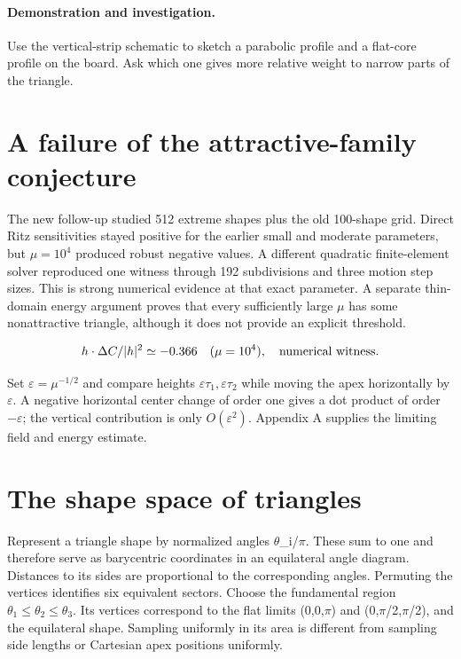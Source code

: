 \documentclass[11pt,oneside,openany]{book}
\begin{document}
\paragraph{Demonstration and investigation.} Use the vertical-strip schematic to sketch a parabolic profile and a flat-core profile on the board. Ask which one gives more relative weight to narrow parts of the triangle.


\section{A failure of the attractive-family conjecture}\label{sec:slide70}

The new follow-up studied 512 extreme shapes plus the old 100-shape grid. Direct Ritz sensitivities stayed positive for the earlier small and moderate parameters, but $\mu=10^4$ produced robust negative values. A different quadratic finite-element solver reproduced one witness through 192 subdivisions and three motion step sizes. This is strong numerical evidence at that exact parameter. A separate thin-domain energy argument proves that every sufficiently large \ensuremath{\mu} has some nonattractive triangle, although it does not provide an explicit threshold.


\[h\cdot\Delta C/|h|^2\simeq-0.366\quad(\mu=10^4),\quad\hbox{numerical witness}.\]


Set $\varepsilon=\mu^{-1/2}$ and compare heights
$\varepsilon\tau_1,\varepsilon\tau_2$ while moving the apex
horizontally by $\varepsilon$. A negative horizontal center change
of order one gives a dot product of order $-\varepsilon$;
the vertical contribution is only $O(\varepsilon^2)$.
Appendix A supplies the limiting field and energy estimate.



\section{The shape space of triangles}\label{sec:slide71}

Represent a triangle shape by normalized angles \ensuremath{\theta}\_i/\ensuremath{\pi}. These sum to one and therefore serve as barycentric coordinates in an equilateral angle diagram. Distances to its sides are proportional to the corresponding angles. Permuting the vertices identifies six equivalent sectors. Choose the fundamental region $\theta_1\le\theta_2\le\theta_3$. Its vertices correspond to the flat limits (0,0,\ensuremath{\pi}) and (0,\ensuremath{\pi}/2,\ensuremath{\pi}/2), and the equilateral shape. Sampling uniformly in its area is different from sampling side lengths or Cartesian apex positions uniformly.
\end{document}
